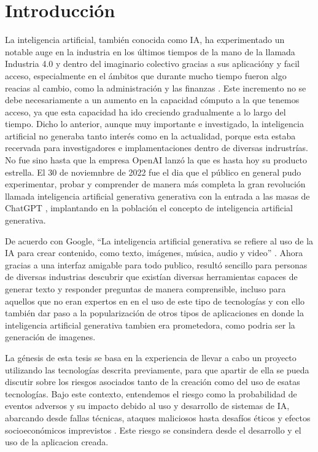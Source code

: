 
\chapter{Introducción}
La inteligencia artificial, también conocida como IA, ha experimentado un notable auge en la industria en los últimos tiempos
de la mano de la llamada Industria 4.0 \cite{intro1} y dentro del imaginario colectivo gracias a sus aplicacióny y facil acceso, 
especialmente en el ámbitos que durante mucho tiempo fueron algo reacias al cambio, como la administración y las finanzas \cite{intro2}. 
Este incremento no se debe necesariamente a un aumento en la capacidad cómputo a la que tenemos acceso, 
ya que esta capacidad ha ido creciendo gradualmente a lo largo del tiempo. Dicho lo anterior, aunque muy importante e investigado, 
la inteligencia artificial no generaba tanto interés como en la actualidad, porque esta estaba recervada para investigadores e implamentaciones dentro de diversas indrustrías.
No fue sino hasta que la empresa OpenAI lanzó la que es hasta hoy su producto estrella. El 30 de noviemnbre de 2022 fue  el dia que el público en general 
pudo experimentar, probar y comprender de manera más completa la gran revolución llamada inteligencia artificial generativa generativa con la entrada a las masas de ChatGPT \cite{intro3},
implantando en la población el concepto de inteligencia artificial generativa.

De acuerdo con Google, ``La inteligencia artificial generativa se refiere al uso de la IA para crear contenido, como texto, imágenes, 
música, audio y video'' \cite{google1}. Ahora gracias a una interfaz amigable para todo publico, resultó sencillo para personas de diversas industrias descubrir que existían 
diversas herramientas capaces de generar texto y responder preguntas de manera comprensible, incluso para aquellos que no eran expertos en 
en el uso de este tipo de tecnologías y con ello también dar paso a la popularización de otros tipos de aplicaciones en donde 
la inteligencia artificial generativa tambien era prometedora, como podria ser la generación de imagenes.

La génesis de esta tesis se basa en la experiencia de llevar a cabo un proyecto utilizando las tecnologías descrita previamente,
para que apartir de ella se pueda discutir sobre los riesgos asociados tanto de la creación como del uso de esatas tecnologías. 
Bajo este contexto, entendemos el riesgo como la probabilidad de eventos adversos y su impacto debido al uso y desarrollo de sistemas de IA, 
abarcando desde fallas técnicas, ataques maliciosos hasta desafíos éticos y efectos socioeconómicos imprevistos \cite{intro1}. Este 
riesgo se consindera desde el desarrollo y el uso de la aplicacion creada.

